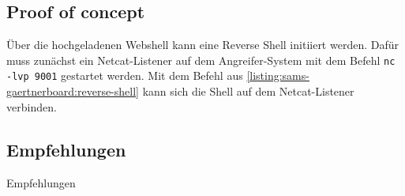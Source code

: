 \subsection*{Proof of concept}
Über die hochgeladenen Webshell kann eine Reverse Shell initiiert werden. Dafür muss zunächst ein Netcat-Listener auf dem Angreifer-System mit dem Befehl \texttt{nc -lvp 9001} gestartet werden. Mit dem Befehl aus \autoref{listing:sams-gaertnerboard:reverse-shell} kann sich die Shell auf dem Netcat-Listener verbinden. 

\subsection*{Empfehlungen}
Empfehlungen
